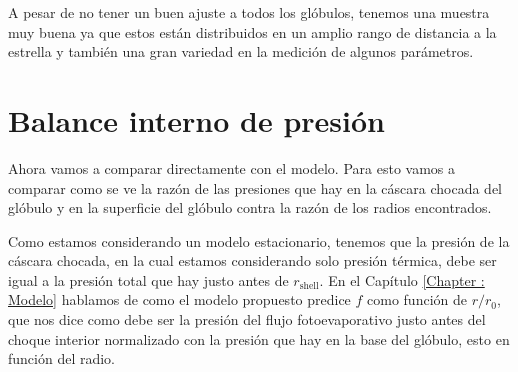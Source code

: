 \documentclass{book}
\begin{document}
A pesar de no tener un buen ajuste a todos los glóbulos, tenemos una muestra muy buena ya que estos están distribuidos en un amplio rango de distancia a la estrella y también una gran variedad en la medición de algunos parámetros. 



\section{Balance interno de presión}\label{Sec : comparacion-modelo}

Ahora vamos a comparar directamente con el modelo. Para esto vamos a comparar como se ve la razón de las presiones que hay en la cáscara chocada del glóbulo y en la superficie del glóbulo contra la razón de los radios encontrados. 

Como estamos considerando un modelo estacionario, tenemos que la presión de la cáscara chocada, en la cual estamos considerando solo presión térmica, debe ser igual a la presión total que hay justo antes de $r_\mathrm{shell}$. En el Capítulo \ref{Chapter : Modelo} hablamos de como el modelo propuesto predice $f$ como función de $r/r_0$, que nos dice como debe ser la presión del flujo fotoevaporativo justo antes del choque interior normalizado con la presión que hay en la base del glóbulo, esto en función del radio.  
\end{document}
